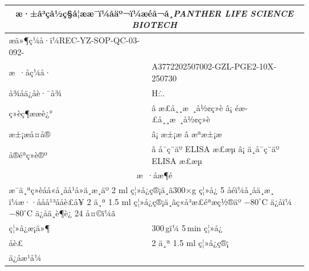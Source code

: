 \documentclass[UTF8,10pt,a4paper,fontset=fandol]{ctexart}
\newcommand{\fieldvalue}[1]{#1}
\newcommand{\handwritten}[1]{#1}
\begin{document}

\newpage

\begin{center}
\small
\begin{tabularx}{\textwidth}{|p{}|X|}
\hline
\multicolumn{2}{|c|}{æ·±å³çå½ç§å­¦ææ¯ï¼åäº¬ï¼æéå¬å¸\quad \textit{PANTHER LIFE SCIENCE BIOTECH}}\\
\hline
æä»¶ç¼å·ï¼REC-YZ-SOP-QC-03-092- & \\
\hline
æ ·åç¼å· &
\fieldvalue{A3772202507002-GZL-PGE2-10X-250730}\\
\hline
å¾åä¿å­è·¯å¾ &
\fieldvalue{\handwritten{H:\...}}\\
\hline
ç»èç¶ææè¿° &
\fieldvalue{â æ­£å¸¸æ ¸å½¢ç»è \quad â¡ éæ­£å¸¸æ ¸å½¢ç»è}\\
\hline
æ±¡æå¤å® &
\fieldvalue{â¡ æ±¡æ \quad â æªæ±¡æ}\\
\hline
å®éªç»è®º &
\fieldvalue{â å¯ç¨äº ELISA æ£æµ \quad â¡ ä¸å¯ç¨äº ELISA æ£æµ}\\
\hline
\multicolumn{2}{|c|}{æ ·åæ¶é}\\
\hline
\multicolumn{2}{|p{\dimexpr\textwidth-2\tabcolsep-2\arrayrulewidth\relax}|}{
æ¯ä¸ªç»èåå«å¸åå¹å»ä¸æ¸äº 2 ml ç¦»å¿ç®¡ä¸­ã300$\times$g ç¦»å¿ 5 åéï¼å¸åä¸æ¸ï¼æ··ååå¹³ååè£å¥ 2 ä¸ª 1.5 ml ç¦»å¿ç®¡ä¸­ãç«å³æ£éªæç½®äº $-80^\circ$C ä¿å­ï¼$-80^\circ$C ä¿å­ä¸è¶è¿ 24 å¤©ï¼ã
}\\
\hline
ç¦»å¿æ¡ä»¶ &
\fieldvalue{\handwritten{300}}\,gï¼%
\fieldvalue{\handwritten{5}}\,min ç¦»å¿\\
\hline
åè£ &
\fieldvalue{\handwritten{2}} ä¸ª 1.5 ml ç¦»å¿ç®¡\\
\hline
ä¿å­æ¹å¼ &

\end{tabularx}
\end{center}
\end{document}
